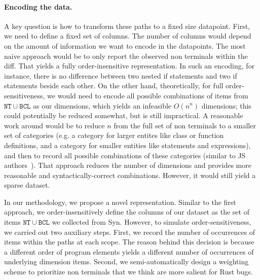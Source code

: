 \paragraph{Encoding the data.} A key question is how to transform these paths to a fixed size datapoint. First, we need to define a fixed set of columns. The number of columns would depend on the amount of information we want to encode in the datapoints. The most naive approach would be to only report the observed non terminals within the diff. That yields a fully order-insensitive representation. In such an encoding, for instance, there is no difference between two nested if statements and two if statements beside each other. On the other hand, theoretically, for full order-sensitiveness, we would need to encode all possible combinations of items from $\mathtt{NT} \cup \mathtt{BCL}$ as our dimensions, which yields an infeasible $O(n^n)$ dimensions; this could potentially be reduced somewhat, but is still impractical. A reasonable work around would be to reduce $n$ from the full set of non terminals to a smaller set of categories (e.g. a category for larger entites like class or function definitions, and a category for smaller entities like statements and expressions), and then to record all possible combinations of these categories (similar to JS authors~\cite{foo}). That approach reduces the number of dimensions and provides more reasonable and syntactically-correct combinations. However, it would still yield a sparse dataset. 

In our methodology, we propose a novel representation. Similar to the first approach, we order-insensitively define the columns of our dataset as the set of items $\mathtt{NT} \cup \mathtt{BCL}$ we collected from Syn. However, to simulate order-sensitiveness, we carried out two auxiliary steps. First, we record the number of occurrences of items within the paths at each scope. The reason behind this decision is because a different order of program elements yields a different number of occurrences of underlying dimension items. Second, we semi-automatically design a weighting scheme to prioritize non terminals that we think are more salient for Rust bugs.

